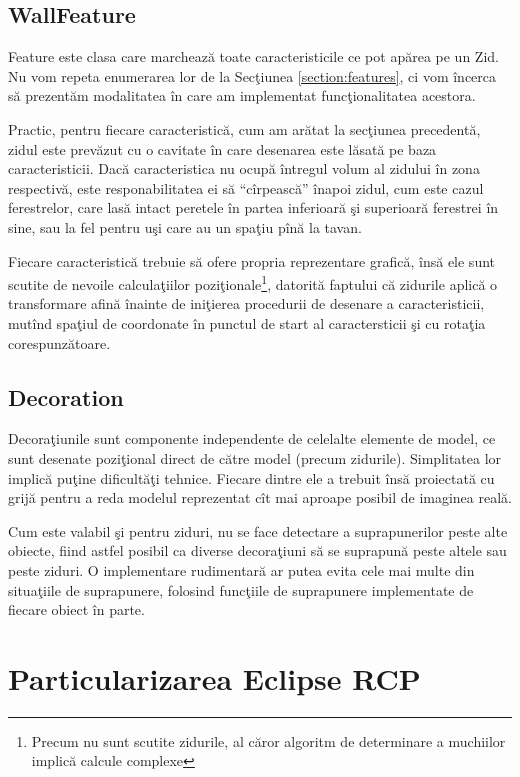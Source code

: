 \subsection{WallFeature}

Feature este clasa care marchează toate caracteristicile ce pot apărea pe un
Zid. Nu vom repeta enumerarea lor de la Secţiunea \ref{section:features}, ci vom
încerca să prezentăm modalitatea în care am implementat funcţionalitatea
acestora.

Practic, pentru fiecare caracteristică, cum am arătat la secţiunea precedentă,
zidul este prevăzut cu o cavitate în care desenarea este lăsată pe baza
caracteristicii. Dacă caracteristica nu ocupă întregul volum al zidului în zona
respectivă, este responabilitatea ei să ``cîrpească'' înapoi zidul, cum este
cazul ferestrelor, care lasă intact peretele în partea inferioară şi superioară
ferestrei în sine, sau la fel pentru uşi care au un spaţiu pînă la tavan.

Fiecare caracteristică trebuie să ofere propria reprezentare grafică, însă ele
sunt scutite de nevoile calculaţiilor poziţionale\footnote{Precum nu sunt
scutite zidurile, al căror algoritm de determinare a muchiilor implică calcule
complexe}, datorită faptului că zidurile aplică o transformare afină înainte de
iniţierea procedurii de desenare a caracteristicii, mutînd spaţiul de coordonate
în punctul de start al caractersticii şi cu rotaţia corespunzătoare.

\subsection{Decoration}

Decoraţiunile sunt componente independente de celelalte elemente de model, ce
sunt desenate poziţional direct de către model (precum zidurile). Simplitatea
lor implică puţine dificultăţi tehnice. Fiecare dintre ele a trebuit însă
proiectată cu grijă pentru a reda modelul reprezentat cît mai aproape posibil de
imaginea reală.

Cum este valabil şi pentru ziduri, nu se face detectare a suprapunerilor peste
alte obiecte, fiind astfel posibil ca diverse decoraţiuni să se suprapună peste
altele sau peste ziduri. O implementare rudimentară ar putea evita cele mai
multe din situaţiile de suprapunere, folosind funcţiile de suprapunere
implementate de fiecare obiect în parte.

\section{Particularizarea Eclipse RCP}

